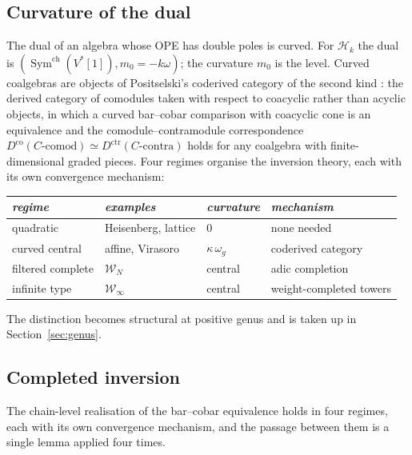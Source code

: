 \documentclass[11pt]{amsart}
\numberwithin{equation}{section}
\theoremstyle{plain}
\theoremstyle{definition}
\theoremstyle{remark}
\newcommand{\cW}{\mathcal{W}}
\begin{document}
\subsection{Curvature of the dual}

The dual of an algebra whose OPE has double poles is curved. For
$\mathcal{H}_k$ the dual is $(\operatorname{Sym}^{\mathrm{ch}}(V^{*}[1]),
m_0=-k\omega)$; the curvature $m_0$ is the level. Curved coalgebras are
objects of Positselski's coderived category of the second kind \cite{Pos}:
the derived category of comodules taken with respect to coacyclic rather
than acyclic objects, in which a curved bar--cobar comparison with
coacyclic cone is an equivalence and the comodule--contramodule
correspondence
$D^{\mathrm{co}}(C\text{-comod})\simeq D^{\mathrm{ctr}}(C\text{-contra})$
holds for any coalgebra with finite-dimensional graded pieces. Four
regimes organise the inversion theory, each with its own convergence
mechanism:
\begin{center}
\begin{tabular}{llll}
\emph{regime} & \emph{examples} & \emph{curvature} & \emph{mechanism}\\
\hline
quadratic & Heisenberg, lattice & $0$ & none needed\\
curved central & affine, Virasoro & $\kappa\,\omega_g$ &
coderived category\\
filtered complete & $\cW_N$ & central & adic completion\\
infinite type & $\cW_\infty$ & central & weight-completed towers
\end{tabular}
\end{center}
The distinction becomes structural at positive genus and is taken up in
Section~\ref{sec:genus}.

\subsection{Completed inversion}

The chain-level realisation of the bar--cobar equivalence holds in four
regimes, each with its own convergence mechanism, and the passage between
them is a single lemma applied four times.
\end{document}
